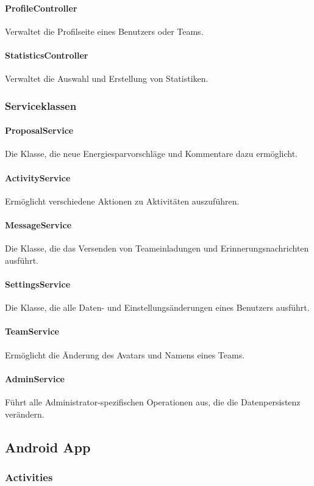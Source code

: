 	\paragraph{ProfileController}Verwaltet die Profilseite eines Benutzers oder Teams.
	\paragraph{StatisticsController}Verwaltet die Auswahl und Erstellung von Statistiken.

\subsubsection{Serviceklassen}
	\paragraph{ProposalService}Die Klasse, die neue Energiesparvorschl\"age und Kommentare dazu erm\"oglicht.
	\paragraph{ActivityService}Erm\"oglicht verschiedene Aktionen zu Aktivit\"aten auszuf\"uhren.
	\paragraph{MessageService}Die Klasse, die das Versenden von Teameinladungen und Erinnerungsnachrichten ausf\"uhrt.
	\paragraph{SettingsService}Die Klasse, die alle Daten- und Einstellungs\"anderungen eines Benutzers ausf\"uhrt.
	\paragraph{TeamService}Erm\"oglicht die \"Anderung des Avatars und Namens eines Teams.
	\paragraph{AdminService}F\"uhrt alle Administrator-spezifischen Operationen aus, die die Datenpersistenz ver\"andern.

\subsection{Android App}

\subsubsection{Activities}
